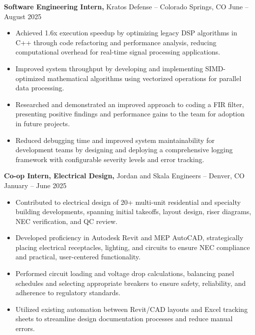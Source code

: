 \documentclass[11pt]{article}
\begin{document}
\textbf{Software Engineering Intern, }{Kratos Defense} -- Colorado Springs, CO \hfill June -- August 2025 \\
\vspace{-5pt}
\begin{itemize}
  \item Achieved 1.6x execution speedup by optimizing legacy DSP algorithms in C++ through code refactoring and performance analysis, reducing computational overhead for real-time signal processing applications.
  \item Improved system throughput by developing and implementing SIMD-optimized mathematical algorithms using vectorized operations for parallel data processing.
  \item Researched and demonstrated an improved approach to coding a FIR filter, presenting positive findings and performance gains to the team for adoption in future projects.
  \item Reduced debugging time and improved system maintainability for development teams by designing and deploying a comprehensive logging framework with configurable severity levels and error tracking.
\end{itemize}

\textbf{Co-op Intern, Electrical Design, }{Jordan and Skala Engineers} -- Denver, CO \hfill January -- June 2025 \\
\vspace{-5pt}
\begin{itemize}
  \item Contributed to electrical design of 20+ multi-unit residential and specialty building developments, spanning initial takeoffs, layout design, riser diagrams, NEC verification, and QC review.
  \item Developed proficiency in Autodesk Revit and MEP AutoCAD, strategically placing electrical receptacles, lighting, and circuits to ensure NEC compliance and practical, user-centered functionality.
  \item Performed circuit loading and voltage drop calculations, balancing panel schedules and selecting appropriate breakers to ensure safety, reliability, and adherence to regulatory standards.
  \item Utilized existing automation between Revit/CAD layouts and Excel tracking sheets to streamline design documentation processes and reduce manual errors.
\end{itemize}

\vspace{-14pt}
\end{document}
